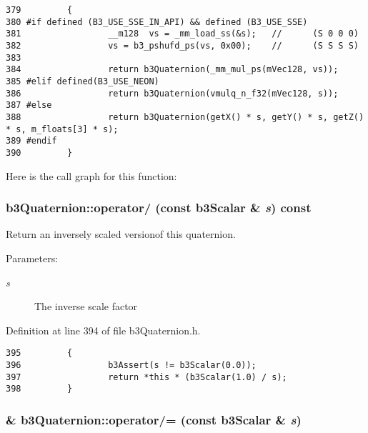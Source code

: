 \begin{Code}\begin{verbatim}379         {
380 #if defined (B3_USE_SSE_IN_API) && defined (B3_USE_SSE)
381                 __m128  vs = _mm_load_ss(&s);   //      (S 0 0 0)
382                 vs = b3_pshufd_ps(vs, 0x00);    //      (S S S S)
383                 
384                 return b3Quaternion(_mm_mul_ps(mVec128, vs));
385 #elif defined(B3_USE_NEON)
386                 return b3Quaternion(vmulq_n_f32(mVec128, s));
387 #else
388                 return b3Quaternion(getX() * s, getY() * s, getZ() * s, m_floats[3] * s);
389 #endif
390         }
\end{verbatim}
\end{Code}




Here is the call graph for this function:\hypertarget{classb3_quaternion_4774d113abff51d66af8cf4da7cccc26}{
\subsubsection[operator/]{ b3Quaternion::operator/ (const b3Scalar \& {\em s}) const}}
\label{classb3_quaternion_4774d113abff51d66af8cf4da7cccc26}


Return an inversely scaled versionof this quaternion. 

\begin{Desc}
\item[Parameters:]
\begin{description}
\item[{\em s}]The inverse scale factor \end{description}
\end{Desc}


Definition at line 394 of file b3Quaternion.h.

\begin{Code}\begin{verbatim}395         {
396                 b3Assert(s != b3Scalar(0.0));
397                 return *this * (b3Scalar(1.0) / s);
398         }
\end{verbatim}
\end{Code}


\hypertarget{classb3_quaternion_293d5a2d8e103d5577a83baa18d4b2b7}{
\subsubsection[operator/=]{\& b3Quaternion::operator/= (const b3Scalar \& {\em s})}}
\label{classb3_quaternion_293d5a2d8e103d5577a83baa18d4b2b7}


